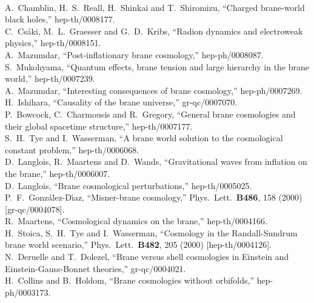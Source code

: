 \documentclass[a4paper,10pt]{article}
\begin{document}
\begin{thebibliography}{99}
\\
A.~Chamblin, H.~S.~Reall, H.~Shinkai and T.~Shiromizu,
``Charged brane-world black holes,''
hep-th/0008177.
\\
C.~Cs\'aki, M.~L.~Graesser and G.~D.~Kribs,
``Radion dynamics and electroweak physics,''
hep-th/0008151.
\\
A.~Mazumdar,
``Post-inflationary brane cosmology,''
hep-ph/0008087.
\\
S.~Mukohyama,
``Quantum effects, brane tension and large hierarchy in the brane world,''
hep-th/0007239.
\\
A.~Mazumdar,
``Interesting consequences of brane cosmology,''
hep-ph/0007269.
\\
H.~Ishihara,
``Causality of the brane universe,''
gr-qc/0007070.
\\
P.~Bowcock, C.~Charmousis and R.~Gregory,
``General brane cosmologies and their global spacetime structure,''
hep-th/0007177.
\\
S.~H.~Tye and I.~Wasserman,
``A brane world solution to the cosmological constant problem,''
hep-th/0006068.
\\
D.~Langlois, R.~Maartens and D.~Wands,
``Gravitational waves from inflation on the brane,''
hep-th/0006007.
\\
D.~Langlois,
``Brane cosmological perturbations,''
hep-th/0005025.
\\
P.~F.~Gonz\'alez-D{\'\i}az,
``Misner-brane cosmology,''
Phys.\ Lett.\  {\bf B486}, 158 (2000)
[gr-qc/0004078].
\\
R.~Maartens,
``Cosmological dynamics on the brane,''
hep-th/0004166.
\\
H.~Stoica, S.~H.~Tye and I.~Wasserman,
``Cosmology in the Randall-Sundrum brane world scenario,''
Phys.\ Lett.\  {\bf B482}, 205 (2000)
[hep-th/0004126].
\\
N.~Deruelle and T.~Dolezel,
``Brane versus shell cosmologies in Einstein and Einstein-Gauss-Bonnet  theories,''
gr-qc/0004021.
\\
H.~Collins and B.~Holdom,
``Brane cosmologies without orbifolds,''
hep-ph/0003173.
\\

\end{thebibliography}
\end{document}
